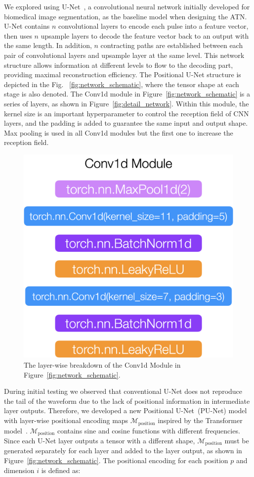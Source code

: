 We explored using U-Net~\cite{UNet}, a convolutional neural network initially developed for biomedical image segmentation, as the baseline model when designing the ATN. U-Net contains $n$ convolutional layers to encode each pulse into a feature vector, then uses $n$ upsample layers to decode the feature vector back to an output with the same length. In addition, $n$ contracting paths are established between each pair of convolutional layers and upsample layer at the same level. This network structure allows information at different levels to flow to the decoding part, providing maximal reconstruction efficiency. The Positional U-Net structure is depicted in the Fig. ~\ref{fig:network_schematic}, where the tensor shape at each stage is also denoted. The Conv1d module in Figure~\ref{fig:network_schematic} is a series of layers, as shown in Figure~\ref{fig:detail_network}. Within this module, the kernel size is an important hyperparameter to control the reception field of CNN layers, and the padding is added to guarantee the same input and output shape. Max pooling is used in all Conv1d modules but the first one to increase the reception field. 
\begin{figure}[htb!]
    \centering
    \includegraphics[width=0.3\linewidth,trim={0pc 0pc 0pc 0pc},clip]{ch6/figs/conv1d.png}
    \caption{The layer-wise breakdown of the Conv1d Module in Figure~\ref{fig:network_schematic}.}
    \label{fig:cov1d_break_down}
\end{figure}

During initial testing we observed that conventional U-Net does not reproduce the tail of the waveform due to the lack of positional information in intermediate layer outputs. Therefore, we developed a new Positional U-Net~(PU-Net) model with layer-wise positional encoding maps $\mathcal{M}_{\mathrm{position}}$ inspired by the Transformer model~\cite{Transformer}. $\mathcal{M}_{\mathrm{position}}$ contains sine and cosine functions with different frequencies. Since each U-Net layer outputs a tensor with a different shape, $\mathcal{M}_{\mathrm{position}}$ must be generated separately for each layer and added to the layer output, as shown in Figure~\ref{fig:network_schematic}. The positional encoding for each position $p$ and dimension $i$ is defined as:

